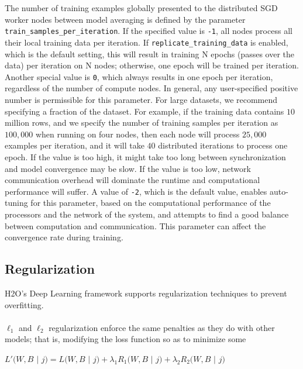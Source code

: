 \documentclass{article}[11pt]
\begin{document}
The number of training examples globally presented to the distributed SGD worker nodes between model averaging is defined by the parameter \texttt{train\_samples\_per\_iteration}. If the specified value is \texttt{-1}, all nodes process all their local training data per iteration. If \texttt{replicate\_training\_data} is enabled, which is the default setting, this will result in training N epochs (passes over the data) per iteration on N nodes; otherwise, one epoch will be trained per iteration. Another special value is \texttt{0}, which always results in one epoch per iteration, regardless of the number of compute nodes. In general, any user-specified positive number is permissible for this parameter. For large datasets, we recommend specifying a fraction of the dataset. 
\newpage
For example, if the training data contains $10$ million rows, and we specify the number of training samples per iteration as $100,000$ when running on four nodes, then each node will process $25,000$ examples per iteration, and it will take $40$ distributed iterations to process one epoch. If the value is too high, it might take too long between synchronization and model convergence may be slow.  If the value is too low, network communication overhead will dominate the runtime and computational performance will suffer. A value of \texttt{-2}, which is the default value, enables auto-tuning for this parameter, based on the computational performance of the processors and the network of the system, and attempts to find a good balance between computation and communication. This parameter can affect the convergence rate during training.
\\
\noindent
\subsection{Regularization} 
\label{ssec:Regularization}
H2O's Deep Learning framework supports regularization techniques to prevent overfitting. 
\\
\\
$\ell_1$ and $\ell_2$ regularization enforce the same penalties as they do with other models; that is, modifying the loss function so as to minimize some  %
\\
\begin{center}
$L'(W,B$ $|$ $j) = L(W,B$ $|$ $j) + \lambda_1 R_1(W,B$ $|$ $j) + \lambda_2 R_2(W,B$ $|$ $j)$
\end{center}
\end{document}
